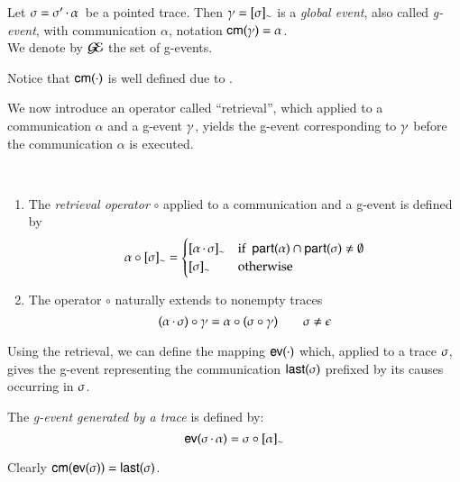 \begin{definition}
Let $\sigma = \sigma'\,{\cdot}\,\alpha\,$ be a pointed
 trace.  
Then $\gamma =
[\sigma]_{\sim}$ is a \emph{global event}, also called \emph{g-event}, with communication
$\alpha$, notation  ${\sf cm}(\gamma)=\alpha$.\\
 We denote by $\mathcal{G\!E}$ the set of g-events.\end{definition}

Notice that  ${\sf cm}(\cdot)$  is well defined due
to .  
 
 \bigskip

 We now introduce an operator called ``retrieval'', which
 applied to a communication $\alpha$ and a g-event $\gamma$, yields
 the g-event corresponding to $\gamma$ before the communication
 $\alpha$ is executed. 
  
  
  \begin{definition}\text{~}\\[-15pt]
    \begin{enumerate}
    \item{} The  {\em retrieval operator} $\circ$ applied to a
  communication and  a g-event  
       is defined by
\[
      \cau{\alpha}\eqclass{\comseq}=\begin{cases}
          \eqclass{\concat{\alpha}{\comseq}} & \text{if~
            $\participant{\alpha}\cap\participant{\comseq} \neq \emptyset$}\\
   \eqclass{\comseq}  & \text{otherwise}
\end{cases}
\]
\item{} The operator $\circ$ naturally extends to  nonempty traces 
\[
(\alpha\,{\cdot}\,\sigma)\circ\gamma=\alpha\circ(\sigma\circ\gamma)\qquad\sigma\not=\epsilon
\]
  \end{enumerate}
\end{definition} 

Using the retrieval, we can define the mapping ${\sf ev}(\cdot)$  which,
 applied to a trace $\sigma$, gives the g-event representing
the communication ${\sf last}(\sigma)$ prefixed by its causes occurring in
$\sigma$. 
\begin{definition}
    The {\em g-event generated by a  trace  } 
 is defined by:
\[
 {\sf ev}(\sigma\,{\cdot}\,\alpha)=\sigma\circ[\alpha]_{\sim}
 \]
 \end{definition}
 Clearly ${\sf cm}({\sf ev}(\sigma))={\sf last}(\sigma)$.


